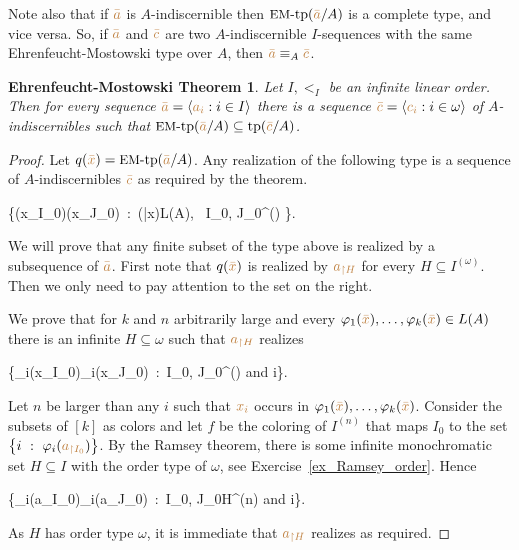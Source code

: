Note also that if ${\color{brown}\bar a}$ is $A$-indiscernible then $\mbox{{\small EM}-tp}({\color{brown}\bar a}/A)$ is a complete type,
and vice versa.
So,
if ${\color{brown}\bar a}$ and ${\color{brown}\bar c}$ are two $A$-indiscernible $I$-sequences with the same Ehren\-feucht-Mostowski type over $A$,
then ${\color{brown}\bar a}\equiv_A {\color{brown}\bar c}$.

\theoremstyle{mio}
\newtheorem{EhrenfeuchtMostowski}[thm]{Ehrenfeucht-Mostowski Theorem}
\begin{EhrenfeuchtMostowski}\label{thm_EM}
Let $I,<_I$ be an infinite linear order.
Then for every sequence ${\color{brown}\bar a}=\langle{\color{brown}a_i}:i\in I\rangle$ there is a sequence ${\color{brown}\bar c}=\langle{\color{brown}c_i}:i\in\omega\rangle$ of $A$-indiscernibles such that $\mbox{{\small EM}-tp}({\color{brown}\bar a}/A)\subseteq{\rm tp}({\color{brown}\bar c}/A)$.
\end{EhrenfeuchtMostowski}

\begin{proof}
Let $q({\color{brown}\bar x})=\mbox{{\small EM}-tp}({\color{brown}\bar a}/A)$.
Any realization of the following type is a sequence of $A$-indiscernibles ${\color{brown}\bar c}$ as required by the theorem.

{\cup}
{\Big\{\phi({\mr x_{\restriction I_0}})\iff\phi({\mr x_{\restriction J_0}})\ :\  \phi({\mr\bar x})\in L(A), \ I_0, J_0\in\omega^{(\omega)} \Big\}.}

We will prove that any finite subset of the type above is realized by a subsequence of ${\color{brown}\bar a}$.
First note that $q({\color{brown}\bar x})$ is realized by ${\color{brown} a_{\restriction H}}$ for every $H\subseteq I^{(\omega)}$.
Then we only need to pay attention to the set on the right.

We prove that for $k$ and $n$ arbitrarily large and every $\varphi_1({\color{brown}\bar x}),\dots,\varphi_k({\color{brown}\bar x})\in L(A)$ there is an infinite $H\subseteq\omega$ such that ${\color{brown} a_{\restriction H}}$ realizes

\ceq{\ssf{\#}}
{}
{\Big\{\phi_i({\mr x_{\restriction I_0}})\iff\phi_i({\mr x_{\restriction J_0}})\ :\  I_0, J_0\in\omega^{(\omega)}\textrm{ and } i\in[k]\Big\}.}

Let $n$ be larger than any $i$ such that ${\color{brown} x_i}$ occurs in $\varphi_1({\color{brown}\bar x}),\dots,\varphi_k({\color{brown}\bar x})$.
Consider the subsets of $[k]$ as colors and let $f$ be the coloring of $I^{(n)}$ that maps $I_0$ to the set $\big\{i\ :\ \varphi_i({\color{brown} a_{\restriction I_0}})\big\}$.
By the Ramsey theorem,
there is some infinite monochromatic set $H\subseteq I$ with the order type of $\omega$, see Exercise~\ref{ex_Ramsey_order}.
Hence

\ceq{}
{}
{\Big\{\phi_i({\mr a_{\restriction I_0}})\iff\phi_i({\mr a_{\restriction J_0}})\ :\  I_0, J_0\in H^{(n)}\textrm{ and } i\in[k]\Big\}.}

As $H$ has order type $\omega$,
it is immediate that ${\color{brown} a_{\restriction H}}$ realizes \ssf{\#}
as required.
\end{proof}

